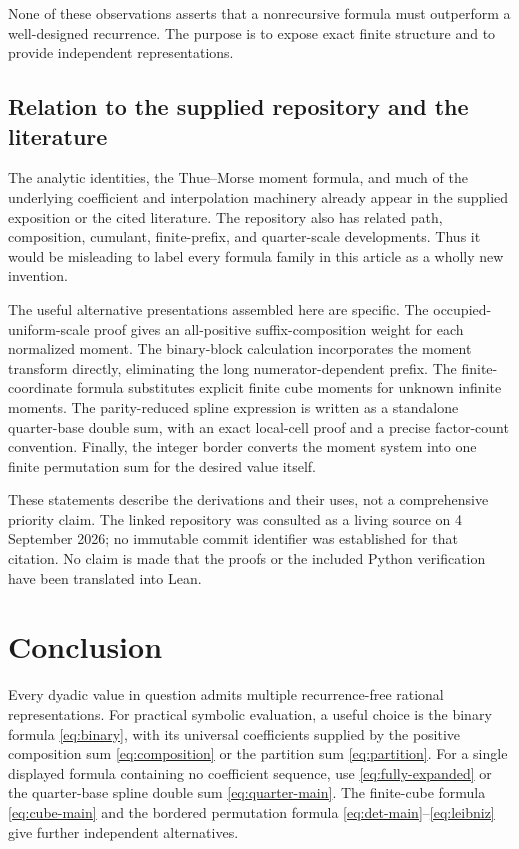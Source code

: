\documentclass[11pt,a4paper]{article}
\theoremstyle{definition}
\theoremstyle{remark}
\begin{document}
None of these observations asserts that a nonrecursive formula must outperform a
well-designed recurrence.  The purpose is to expose exact finite structure and to
provide independent representations.

\subsection{Relation to the supplied repository and the literature}
The analytic identities, the Thue--Morse moment formula, and much of the underlying
coefficient and interpolation machinery already appear in the supplied exposition
\cite{repo} or the cited literature.  The repository also has related path,
composition, cumulant, finite-prefix, and quarter-scale developments.  Thus it would
be misleading to label every formula family in this article as a wholly new
invention.

The useful alternative presentations assembled here are specific.  The
occupied-uniform-scale proof gives an all-positive suffix-composition weight for
each normalized moment.  The binary-block calculation incorporates the moment
transform directly, eliminating the long numerator-dependent prefix.  The
finite-coordinate formula substitutes explicit finite cube moments for unknown
infinite moments.  The parity-reduced spline expression is written as a standalone
quarter-base double sum, with an exact local-cell proof and a precise factor-count
convention.  Finally, the integer border converts the moment system into one finite
permutation sum for the desired value itself.

These statements describe the derivations and their uses, not a comprehensive
priority claim.  The linked repository was consulted as a living source on
4 September 2026; no immutable commit identifier was established for that citation.
No claim is made that the proofs or the included Python verification have been
translated into Lean.

\section{Conclusion}
Every dyadic value in question admits multiple recurrence-free rational
representations.  For practical symbolic evaluation, a useful choice is the binary
formula \eqref{eq:binary}, with its universal coefficients supplied by the positive
composition sum \eqref{eq:composition} or the partition sum \eqref{eq:partition}.
For a single displayed formula containing no coefficient sequence, use
\eqref{eq:fully-expanded} or the quarter-base spline double sum
\eqref{eq:quarter-main}.  The finite-cube formula \eqref{eq:cube-main} and the
bordered permutation formula \eqref{eq:det-main}--\eqref{eq:leibniz} give further
independent alternatives.
\end{document}
